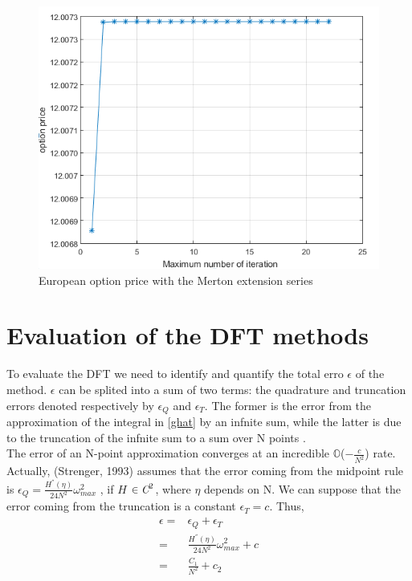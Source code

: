 \documentclass[12pt]{report}
\begin{document}
\begin{figure}[H]
\centering
\includegraphics{maxiteration.png} 
\caption{ European option price with the Merton extension series}
\end{figure}


\section{Evaluation of the DFT methods }

To evaluate the DFT we need to identify and quantify the total erro $\epsilon$ of the method.
 $\epsilon$ can be splited into a sum of two terms: the quadrature and truncation errors denoted respectively by $\epsilon_Q$ and $\epsilon_T$. The former is the error from the approximation of the integral in \eqref{ghat} by an infnite sum, while the latter is due to the truncation of the infnite sum to a sum over N points .\\


 The error of an N-point approximation converges at an incredible $\mathbb{O}$($-\frac{c}{N^2}$) rate. Actually, (Strenger, 1993)  assumes that the error coming from the midpoint rule is  $\epsilon_Q=\frac{H^{''}(\eta)}{24N^2} \omega_{max}^2$ , if 
 $H$ $\in  \emph{C}^2$, where $\eta$ depends on N. We can suppose that the error coming from the truncation is a constant $\epsilon_T=c$. 
Thus, 
\begin{align}
\epsilon=&\epsilon_Q+\epsilon_T \nonumber \\
=&\frac{H^{''}(\eta)}{24N^2} \omega_{max}^2+c \nonumber \\
=&\frac{C_1}{N^2}+c_2
\end{align}
\end{document}
